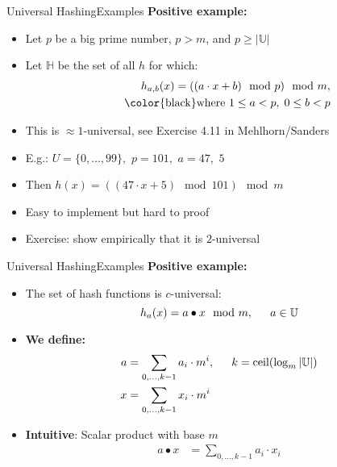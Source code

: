 \begin{frame}{Universal Hashing}{Examples}
  \textbf{Positive example:}
  \begin{itemize}
    \item<1->
      Let {\color{Mittel-Blau}$p$} be a big prime number, {\color{Mittel-Blau}$p > m$}, and {\color{Mittel-Blau}$p \geq \vert \mathbb{U} \vert$}
    \item<2->
      Let {\color{Mittel-Blau}$\mathbb{H}$} be the set of all {\color{Mittel-Blau}$h$} for which:
      {\color{Mittel-Blau}
      \begin{align*}
        h_{a, b}(x) = ((a \cdot x + b) \mod p) \mod m,\\
        \hspace*{1.5em} \text{{\color{black}where }} 1 \leq a < p, \; 0 \leq b < p
      \end{align*}}
    \item<3-> This is {\color{Mittel-Blau}$\approx1$-universal}, see {\color{teal}Exercise 4.11} in Mehlhorn/Sanders
    \item<4-> E.g.: {\color{Mittel-Blau}$U=\{0,...,99\},$ \hspace{0.5em} $p=101,$ \hspace{0.5em} $a=47,$ $5$}
   \item<5-> Then {\color{Mittel-Blau}$h(x) = ((47 \cdot x + 5) \mod 101) \mod m$}
   \item<6-> Easy to implement but hard to proof
   \item<7-> Exercise: show empirically that it is {\color{Mittel-Blau}$2$}-universal
  \end{itemize}
\end{frame}


\begin{frame}{Universal Hashing}{Examples}
  \textbf{Positive example:}
  \begin{itemize}
    \item<1->
      The set of hash functions is {\color{Mittel-Blau}$c$}-universal:
      {\color{Mittel-Blau}
      \[h_{a}(x) = a \bullet x \mod m, \hspace*{1.5em} a \in \mathbb{U}\]}
    \item<2->
      \textbf{We define:}
      {\color{Mittel-Blau}
      \begin{align*}
        a &= \sum_{0, \ldots, k-1} a_i \cdot m^i,
        \hspace*{1.5em} k = \mathrm{ceil}(\log_m \vert \mathbb{U} \vert)\\
        x &= \sum_{0, \ldots, k-1} x_i \cdot m^i
      \end{align*}}
    \item<3->
      \textbf{Intuitive}: Scalar product with base {\color{Mittel-Blau}$m$}
      {\color{Mittel-Blau}
      \begin{align*}
        a \bullet x &= \sum_{0, \ldots, k-1} a_i \cdot x_i
      \end{align*}}
  \end{itemize}
\end{frame}

